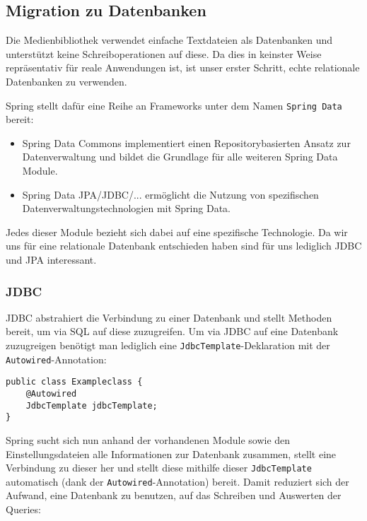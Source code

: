 \documentclass{article}
\begin{document}
\subsection{Migration zu Datenbanken}

Die Medienbibliothek verwendet einfache Textdateien als Datenbanken und unterstützt keine Schreiboperationen auf diese. Da dies in keinster Weise repräsentativ für reale Anwendungen ist, ist unser erster Schritt, echte relationale Datenbanken zu verwenden.

Spring stellt dafür eine Reihe an Frameworks unter dem Namen \texttt{Spring Data} bereit:
\begin{itemize}
        \item{Spring Data Commons} {implementiert einen Repositorybasierten Ansatz zur Datenverwaltung und bildet die Grundlage für alle weiteren Spring Data Module.}
        \item{Spring Data JPA/JDBC/...} ermöglicht die Nutzung von spezifischen Datenverwaltungstechnologien mit Spring Data.
\end{itemize}

Jedes dieser Module bezieht sich dabei auf eine spezifische Technologie. Da wir uns für eine relationale Datenbank entschieden haben sind für uns lediglich JDBC und JPA interessant.

\subsubsection{JDBC}

JDBC abstrahiert die Verbindung zu einer Datenbank und stellt Methoden bereit, um via SQL auf diese zuzugreifen. Um via JDBC auf eine Datenbank zuzugreigen benötigt man lediglich eine \texttt{JdbcTemplate}-Deklaration mit der \texttt{Autowired}-Annotation:

\begin{lstlisting}
public class Exampleclass {
    @Autowired
    JdbcTemplate jdbcTemplate;
}
\end{lstlisting}

Spring sucht sich nun anhand der vorhandenen Module sowie den Einstellungsdateien alle Informationen zur Datenbank zusammen, stellt eine Verbindung zu dieser her und stellt diese mithilfe dieser \texttt{JdbcTemplate} automatisch (dank der \texttt{Autowired}-Annotation) bereit. Damit reduziert sich der Aufwand, eine Datenbank zu benutzen, auf das Schreiben und Auswerten der Queries:
\end{document}
